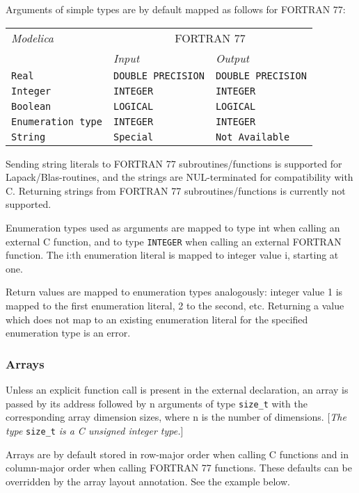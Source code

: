 Arguments of simple types are by default mapped as follows for FORTRAN
77:

\begin{longtable}[]{|l|l|l|}
\hline
\emph{Modelica} & \multicolumn{2}{c|}{FORTRAN 77}\\
& \emph{Input} & \emph{Output}\\ \hline
\endhead
\lstinline!Real! & \lstinline!DOUBLE PRECISION! & \lstinline!DOUBLE PRECISION!\\ \hline
\lstinline!Integer! & \lstinline!INTEGER! & \lstinline!INTEGER!\\ \hline
\lstinline!Boolean! & \lstinline!LOGICAL! & \lstinline!LOGICAL!\\ \hline
\lstinline!Enumeration type! & \lstinline!INTEGER! & \lstinline!INTEGER!\\ \hline
\lstinline!String! & \lstinline!Special! & \lstinline!Not Available!\\ \hline
\end{longtable}

Sending string literals to FORTRAN 77 subroutines/functions is supported
for Lapack/Blas-routines, and the strings are NUL-terminated for
compatibility with C. Returning strings from FORTRAN 77
subroutines/functions is currently not supported.

Enumeration types used as arguments are mapped to type int when calling
an external C function, and to type \lstinline!INTEGER! when calling an external
FORTRAN function. The i:th enumeration literal is mapped to integer
value i, starting at one.

Return values are mapped to enumeration types analogously: integer value
1 is mapped to the first enumeration literal, 2 to the second, etc.
Returning a value which does not map to an existing enumeration literal
for the specified enumeration type is an error.

\subsubsection{Arrays}

Unless an explicit function call is present in the external declaration,
an array is passed by its address followed by n arguments of type
\lstinline!size_t! with the corresponding array dimension sizes, where n is the
number of dimensions. {[}\emph{The type} \lstinline!size_t! \emph{is a C unsigned
integer type.}{]}

Arrays are by default stored in row-major order when calling C functions
and in column-major order when calling FORTRAN 77 functions. These
defaults can be overridden by the array layout annotation. See the
example below.

